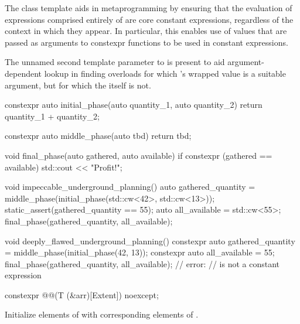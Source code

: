 \pnum
The class template  aids in metaprogramming by ensuring
that the evaluation of expressions comprised entirely of 
are core constant expressions,
regardless of the context in which they appear.
In particular, this enables use of  values
that are passed as arguments to constexpr functions to be used in constant expressions.

\pnum
\begin{note}
The unnamed second template parameter to  is present
to aid argument-dependent lookup
in finding overloads for which 's wrapped value is a suitable argument,
but for which the  itself is not.
\end{note}

\pnum
\begin{example}
\begin{codeblock}
  constexpr auto initial_phase(auto quantity_1, auto quantity_2) {
    return quantity_1 + quantity_2;
  }

  constexpr auto middle_phase(auto tbd) {
    return tbd;
  }

  void final_phase(auto gathered, auto available) {
    if constexpr (gathered == available)
      std::cout << "Profit!\n";
  }

  void impeccable_underground_planning() {
    auto gathered_quantity = middle_phase(initial_phase(std::cw<42>, std::cw<13>));
    static_assert(gathered_quantity == 55);
    auto all_available = std::cw<55>;
    final_phase(gathered_quantity, all_available);
  }

  void deeply_flawed_underground_planning() {
    constexpr auto gathered_quantity = middle_phase(initial_phase(42, 13));
    constexpr auto all_available = 55;
    final_phase(gathered_quantity, all_available);  // error: 
                                                    // is not a constant expression
  }
\end{codeblock}
\end{example}

\begin{itemdecl}
constexpr @@(T (&arr)[Extent]) noexcept;
\end{itemdecl}

\begin{itemdescr}
\pnum
\effects
Initialize elements of  with corresponding elements of .
\end{itemdescr}

